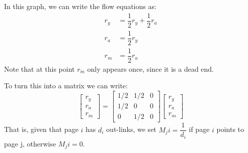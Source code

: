 In this graph, we can write the flow equations as:
\begin{align*}
r_y &= \dfrac{1}{2}r_y + \dfrac{1}{2}r_a \\
r_a &= \dfrac{1}{2}r_y \\
r_m &= \dfrac{1}{2}r_a
\end{align*}
Note that at this point $r_m$ only appears once, since it is a dead end.

To turn this into a matrix we can write:
\[
\begin{bmatrix}
r_y \\
r_a \\
r_m
\end{bmatrix}
=
\begin{bmatrix}
1/2 & 1/2 & 0 \\
1/2 & 0 & 0 \\
0 & 1/2 & 0
\end{bmatrix}
\begin{bmatrix}
r_y \\
r_a \\
r_m
\end{bmatrix}
\]
That is, given that page $i$ has $d_i$ out-links, we set $M_ji=\dfrac{1}{d_i}$ if page $i$ points to page j, otherwise $M_ji=0$.

